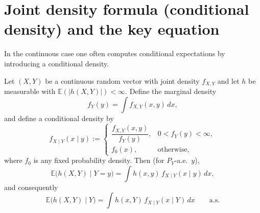 \section{Joint density formula (conditional density) and the key equation}

In the continuous case one often computes conditional expectations by introducing a conditional density. 

\begin{lemma}
\label{lem:cond_density}
Let $(X,Y)$ be a continuous random vector with joint density $f_{X,Y}$ and let $h$ be measurable with
$\mathbb E(|h(X,Y)|)<\infty$. Define the marginal density
\[
f_Y(y)=\int f_{X,Y}(x,y)\,dx,
\]
and define a conditional density by
\[
f_{X\mid Y}(x\mid y):=
\begin{cases}
\dfrac{f_{X,Y}(x,y)}{f_Y(y)}, & 0<f_Y(y)<\infty,\\[1.2ex]
f_0(x), & \text{otherwise,}
\end{cases}
\]
where $f_0$ is any fixed probability density.
Then (for $P_Y$-a.e.\ $y$),
\begin{equation}
\label{eq:condexp_density}
\mathbb E\bigl(h(X,Y)\mid Y=y\bigr)=\int h(x,y)\,f_{X\mid Y}(x\mid y)\,dx,
\end{equation}
and consequently
\[
\mathbb E\bigl(h(X,Y)\mid Y\bigr)=\int h(x,Y)\,f_{X\mid Y}(x\mid Y)\,dx\qquad \text{a.s.}
\]
\end{lemma}

